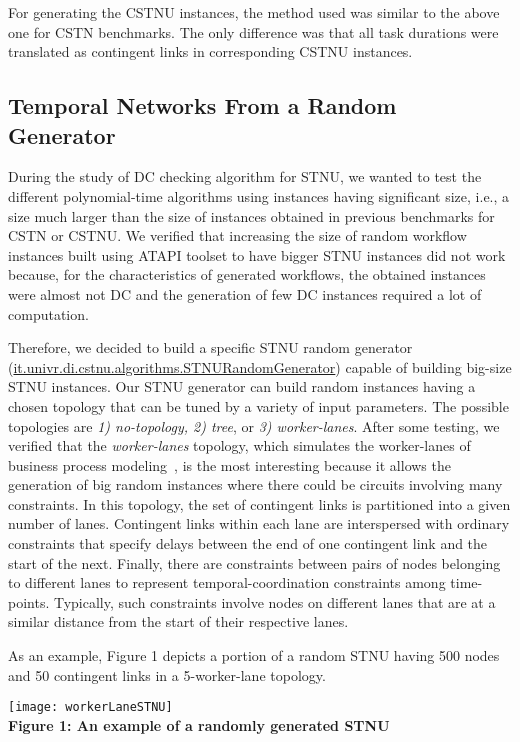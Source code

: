 \documentclass[a4paper,11pt]{article}
\begin{document}
For generating the CSTNU instances, the method used was similar to the above one for CSTN benchmarks. The only difference was that all task durations were translated as contingent links in corresponding CSTNU instances.

\subsection{Temporal Networks From a Random Generator}\label{SECT:STNUGenerator}
During the study of DC checking algorithm for STNU, we wanted to test the different polynomial-time algorithms using instances having significant size, i.e., a size much larger than the size of instances obtained in previous benchmarks for CSTN or CSTNU.
We verified that increasing the size of random workflow instances built using ATAPI toolset to have bigger STNU instances did not work because, for the characteristics of generated workflows, the obtained instances were almost not DC and the generation of few DC instances required a lot of computation.

Therefore, we decided to build a specific STNU random generator (\href{http://profs.scienze.univr.it/~posenato/software/cstnu/apidocs/it/univr/di/cstnu/algorithms/STNURandomGenerator.html}{it.univr.di.cstnu.algorithms.STNURandomGenerator}) capable of building big-size STNU instances.
Our STNU generator can build random instances having a chosen topology that can be tuned by a variety of input parameters.
The possible topologies are \textit{1) no-topology, 2) tree}, or \textit{3) worker-lanes}.
After some testing, we verified that the \textit{worker-lanes} topology, which simulates the worker-lanes of business process modeling~\cite{bpmi}, is the most interesting because it allows the generation of big random instances where there could be circuits involving many constraints. 
In this topology, the set of contingent links is partitioned into a given  number of lanes.
Contingent links within each lane are interspersed with ordinary constraints that
specify delays between the end of one contingent link and the start of the next.
Finally, there are constraints between pairs of nodes belonging to different lanes to represent temporal-coordination constraints among time-points. Typically, such constraints involve 
nodes on different lanes that are at a similar distance from the start of their respective lanes. 

As an example, Figure 1 depicts a portion of a random STNU having 500 nodes and 50 contingent links in a 5-worker-lane topology.
\begin{center}
\texttt{[image: workerLaneSTNU]}\\%
\textbf{Figure 1: An example of a randomly generated STNU}%
\end{center}
\end{document}
